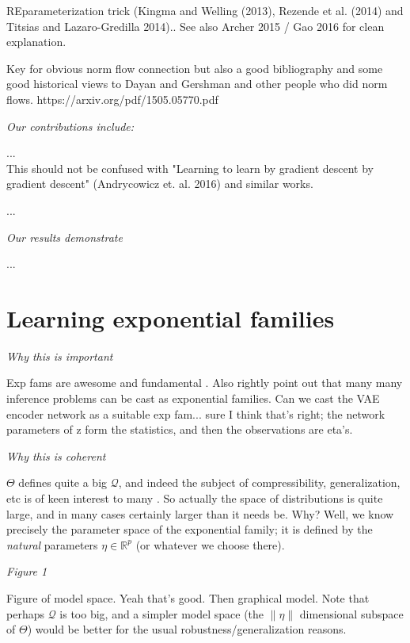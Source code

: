 \documentclass{article}
\begin{document}
REparameterization trick (Kingma and Welling (2013), Rezende et al. (2014) and Titsias and Lazaro-Gredilla 2014)..  See also Archer 2015 / Gao 2016 for clean explanation.  
 
 Key for obvious norm flow connection but also a good bibliography and some good historical views to Dayan and Gershman and other people who did norm flows.  https://arxiv.org/pdf/1505.05770.pdf
 
\emph{Our contributions include:}


... \\
This should not be confused with "Learning to learn by gradient descent by gradient descent" (Andrycowicz et. al. 2016) and similar works.

...

\emph{Our results demonstrate}

...

  
 \section{Learning exponential families}
 
 

 \emph{Why this is important}
 
Exp fams are awesome and fundamental \cite{}.  Also \cite{wainwrightjordan2008graphical} rightly point out that many many inference problems can be cast as exponential families.  Can we cast the VAE encoder network as a suitable exp fam... sure I think that's right; the network parameters of z form the statistics, and then the observations are eta's.  
 
 \emph{Why this is coherent}
 
 $\Theta$ defines quite a big $\mathcal{Q}$, and indeed the subject of compressibility, generalization, etc is of keen interest to many \cite{zhou2018compressability}.  So actually the space of distributions is quite large, and in many cases certainly larger than it needs be.  Why?  Well, we know precisely the parameter space of the exponential family; it is defined by the \emph{natural} parameters $\eta \in \mathbb{R}^p$ (or whatever we choose there).
 
 \emph{Figure 1}
 
 Figure of model space.  Yeah that's good.  Then graphical model.
 Note that perhaps $\mathcal{Q}$ is too big, and a simpler model space (the $\|\eta\|$ dimensional subspace of $\Theta$) would be better for the usual robustness/generalization reasons.  
 
\end{document}
